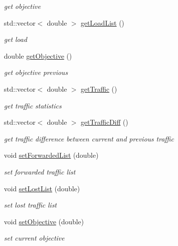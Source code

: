 \begin{DoxyCompactItemize}
\begin{DoxyCompactList}\small\item\em get objective \end{DoxyCompactList}\item 
std\-::vector$<$ double $>$ \hyperlink{classstatistics_a170d529ea5d3c459755309e2de1d166e}{get\-Load\-List} ()
\begin{DoxyCompactList}\small\item\em get load \end{DoxyCompactList}\item 
double \hyperlink{classstatistics_a8a09566df54f2ac183e0a40f452546a6}{get\-Objective} ()
\begin{DoxyCompactList}\small\item\em get objective previous \end{DoxyCompactList}\item 
std\-::vector$<$ double $>$ \hyperlink{classstatistics_af512ba48d195d791b927bc49e2c40188}{get\-Traffic} ()
\begin{DoxyCompactList}\small\item\em get traffic statistics \end{DoxyCompactList}\item 
std\-::vector$<$ double $>$ \hyperlink{classstatistics_a7aa58e77f08e583a87f9050a5b1cf4f9}{get\-Traffic\-Diff} ()
\begin{DoxyCompactList}\small\item\em get traffic difference between current and previous traffic \end{DoxyCompactList}\item 
void \hyperlink{classstatistics_a94f979fcc6d511583638d6fc12116992}{set\-Forwarded\-List} (double)
\begin{DoxyCompactList}\small\item\em set forwarded traffic list \end{DoxyCompactList}\item 
void \hyperlink{classstatistics_a84bead3d62e23af1777b5e54c6de48de}{set\-Lost\-List} (double)
\begin{DoxyCompactList}\small\item\em set lost traffic list \end{DoxyCompactList}\item 
void \hyperlink{classstatistics_ab2fd434123379e7814c21bc38ff2bb20}{set\-Objective} (double)
\begin{DoxyCompactList}\small\item\em set current objective \end{DoxyCompactList}\item 

\end{DoxyCompactItemize}
